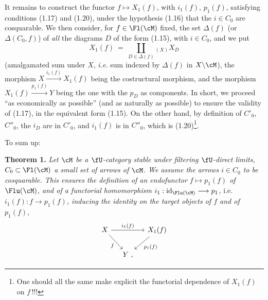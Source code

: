 It remains to construct the functor $f \longmapsto X_1(f)$, with $i_1(f)$, $p_1(f)$, satisfying conditions (1.17) and (1.20), under the hypothesis (1.16) that the $i \in C_0$ are cosquarable. We then consider, for $f \in \Fl(\cM)$ fixed, the set $\Delta(f)$ (or $\Delta(C_0, f)$) of \textit{all} the diagrams $D$ of the form (1.15), with $i \in C_0$, and we put
\[
X_1(f) \ = \ \coprod_{D \in \Delta(f)}{}_{(X)} X_D
\tag*{(1.23)}
\]
(amalgamated sum under $X$, \textit{i.e.} sum indexed
by $\Delta(f)$ in $X\backslash\cM$), the morphism $X \xrightarrow{i_1(f)} X_1(f)$ being the costructural morphism, and the morphism $X_1(f) \xrightarrow{p_1(f)} Y$ being the one with the $p_D$ as components. In short, we proceed ``as economically as possible'' (and as naturally as possible) to ensure the validity of (1.17), in the equivalent form (1.15). On the other hand, by definition of $C'_0$, $C''_0$, the $i_D$ are in $C'_0$, and $i_1(f)$ is in $C''_0$, which is (1.20)\footnote{One should all the same make explicit the functorial dependence of $X_1(f)$ on $f$\,!!!}.

To sum up:

\textbf{Theorem 1.} \textit{Let $\cM$ be a $\fU$-category stable under filtering $\fU$-direct limits, $C_0 \subset \Fl(\cM)$ a small set of arrows of $\cM$. We assume the arrows $i \in C_0$ to be cosquarable. This ensures the definition of an endofunctor $f \longmapsto p_1(f)$ of $\Flu(\cM)$, and of a functorial homomorphism $i_1 : \mathrm{id}_{\Flu(\cM)} \longrightarrow p_1$,} i.e. \textit{$i_1(f) : f \longrightarrow p_1(f)$, inducing the identity on the target objects of $f$ and of $p_1(f)$,}
\[
\begin{tikzcd}[column sep=small]
X \arrow[rr, "i_1(f)"] \arrow[dr, "f"'] & & X_1(f) \arrow[dl, "p_1(f)"] \\
 & Y \ , &
\end{tikzcd}
\]